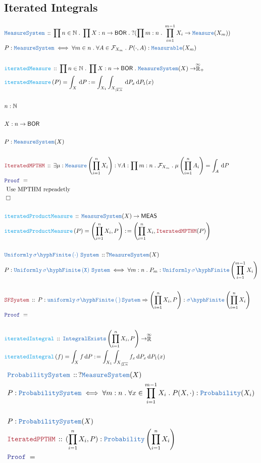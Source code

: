 \documentclass[12pt]{scrartcl}
\newcommand{\TYPE}[1]{\textcolor{NavyBlue}{\mathtt{#1}}}
\newcommand{\FUNC}[1]{\textcolor{Cerulean}{\mathtt{#1}}}
\newcommand{\LOGIC}[1]{\textcolor{Blue}{\mathtt{#1}}}
\newcommand{\THM}[1]{\textcolor{Maroon}{\mathtt{#1}}}
\renewcommand{\.}{\; . \;}
\newcommand{\de}{: \kern 0.1pc =}
\newcommand{\Act}[1]{\left( #1 \right)}
\newcommand{\Theorem}[2]{& \THM{#1} \, :: \, #2 \\ & \Proof = \\ }
\newcommand{\DeclareType}[2]{& \TYPE{#1} \, :: \, #2 \\}
\newcommand{\DefineType}[3]{& #1 : \TYPE{#2} \iff #3 \\}
\newcommand{\DeclareFunc}[2]{& \FUNC{#1} \, :: \, #2 \\}
\newcommand{\DefineNamedFunc}[4]{&  \FUNC{#1}\Act{#2} = #3 \de #4 \\}
\newcommand{\Page}[1]{ \begin{align*} #1 \end{align*}   }
\newcommand{\Nat}{\mathbb{N} }
\newcommand{\EReals}{\stackrel{\mathclap{\infty}}{\mathbb{R}}}
\newcommand{\QED}{\; \square}
\newcommand{\EndProof}{& \QED \\}
\newcommand{\Proof}{\LOGIC{Proof} \; }
\newcommand{\BOR}{\mathsf{BOR}}
\newcommand{\SF}[1]{\TYPE{\sigma \hyph  Finite}\left( #1 \right) }
\newcommand{\F}{\mathcal{F}}
\newcommand{\MEAS}{\mathsf{MEAS}}
\begin{document}
\subsection{Iterated Integrals}
\Page{
\DeclareType{MeasureSystem}{ \prod n \in \Nat \. \prod X : n \to \BOR \. ?( \prod m : n \. \prod^{m -1}_{i = 1} X_i \to  \TYPE{Measure}(X_m)   )   }
\DefineType{ P  }{ \TYPE{MeasureSystem} }{ \forall  m  \in n \. \forall A \in \F_{X_m} \. P( \cdot, A) : \TYPE{Measurable}(X_m)  }
\\
\DeclareFunc{iteratedMeasure}{ \prod n \in \Nat \. \prod X : n \to \BOR \. \TYPE{MeasureSystem}(X) \to \EReals_+  }
\DefineNamedFunc{iteratedMeasure}{ P }{ \int_X \, \mathrm{d}P }{ \int_{X_1} \int_{X_{|\overline{2,n}}}\, \mathrm{d}P_x \, \mathrm{d}P_1(x) }
\\
& n : \Nat
\\ \\
& X : n \to \BOR
\\ \\
& P : \TYPE{MeasureSystem}(X)
\\ \\
\Theorem{IteratedMPTHM}{ 
 \exists \mu : \TYPE{Measure}\left( \prod^n_{i = 1} X_i \right) : \forall A : \prod m : n \. \F_{X_m} \. \mu \left( \prod^n_{i = 1} A_i  \right) = \int_A \, \mathrm{d} P
}        
& \text{ Use MPTHM repeadetly  } \\
\EndProof
\\
\DeclareFunc{ iteratedProductMeasure }{ \TYPE{MeasureSystem}(X) \to \MEAS }
\DefineNamedFunc{ \FUNC{iteratedProductMeasure } }{P}{ \left( \prod^n_{i = 1} X_i , P\right) }{ \left( \prod^n_{i = 1} X_i, \THM{IteratedMPTHM}(P)    \right) }
\\
\DeclareType{ Uniformly \, \SF{\cdot} \, System  }{?\TYPE{MeasureSystem}(X)}
\DefineType{ P  }{ Uniformly \, \SF{X} \, System }{  \forall m : n \. P_m : \TYPE{Uniformly} \, \SF{ \prod^{m - 1}_{i = 1} X_i }  }
\\
\Theorem{ SFSystem}{ P : \TYPE{uniformly \, \SF \, System} \Rightarrow  \left( \prod^n_{i = 1} X_i, P \right) : \SF{  \prod^n_{i = 1} X_i } }
\\
\DeclareFunc{ iteratedIntegral}{ \TYPE{IntegralExists}\left( \prod^n_{i = 1} X_i, P \right) \to \EReals  }
\DefineNamedFunc{ iteratedIntegral }{ f }{ \int_X f \, \mathrm{d}P }{ \int_{X_1} \int_{X_{|\overline{2,n}}} f_x \, \mathrm{d}P_x \, \mathrm{d}P_1(x)  }
}
\newpage
\Page{
 \DeclareType{ProbabilitySystem}{ ? \TYPE{MeasureSystem}(X) }
 \DefineType{P}{ProbabilitySystem}{ \forall m : n \. \forall x \in \prod^{m -1}_{i = 1} X_i \. P(X, \cdot)  : \TYPE{Probability}(X_i) }
\\
& P : \TYPE{ProbabilitySystem}(X)   
\\
\Theorem{IteratedPPTHM}{ ( \prod^n_{i = 1} X_i, P) : \TYPE{Probability}\left( \prod^n_{i = 1} X_i   \right)    }
} 
\newpage
\end{document}
